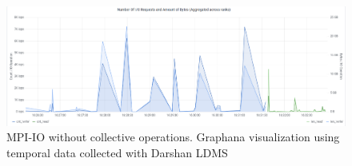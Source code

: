 \begin{figure}
	\centering
	\includegraphics[width=\textwidth]{figs/255653_mpi_io_luster_no_coll.pdf}
	\caption{MPI-IO without collective operations. Graphana visualization using temporal data collected
          with Darshan LDMS}
	\label{f:CSV Header and Output}
      \end{figure}

